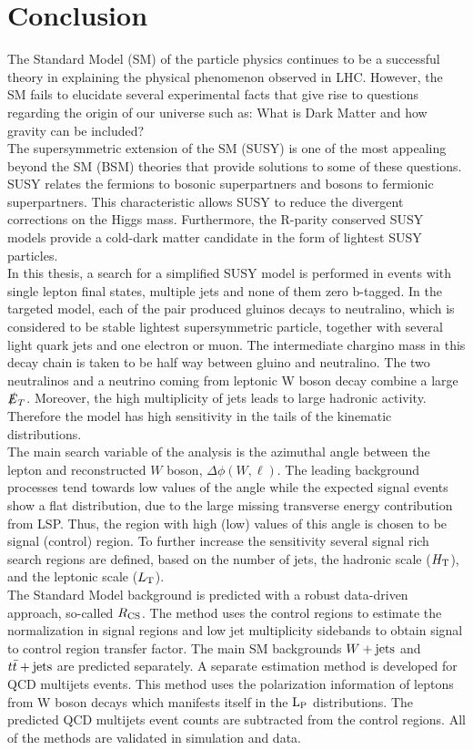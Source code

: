 \chapter{Conclusion}
The Standard Model (SM) of the particle physics continues to be a successful theory in explaining the physical phenomenon observed in LHC. However, the SM fails to elucidate several experimental facts that give rise to questions regarding the origin of our universe such as: What is Dark Matter and how gravity can be included?\\
The supersymmetric extension of the SM (SUSY) is one of the most appealing beyond the SM (BSM) theories that provide solutions to some of these questions. SUSY relates the fermions to bosonic superpartners and bosons to fermionic superpartners. This characteristic allows SUSY to reduce the divergent corrections on the Higgs mass.  Furthermore, the R-parity conserved SUSY models provide a cold-dark matter candidate in the form of lightest SUSY particles. \\
In this thesis, a search for a simplified SUSY model is performed in events with single lepton final states, multiple jets and none of them zero b-tagged. In the targeted model, each of the pair produced gluinos decays to neutralino, which is considered to be stable lightest supersymmetric particle, together with several light quark jets and one electron or muon. The intermediate chargino mass in this decay chain is taken to be half way between gluino and neutralino. The two neutralinos and a neutrino coming from leptonic W boson decay combine a large $\slashed{E}_T$. Moreover, the high multiplicity of jets leads to large hadronic activity. Therefore the model has high sensitivity in the tails of the kinematic distributions.  \\
The main search variable of the analysis is the azimuthal angle between the lepton and reconstructed $W$ boson, $\Delta\phi(W,\ell)$. The leading background processes tend towards low values of the angle while the expected signal events show a flat distribution, due to the large missing transverse energy contribution from LSP. Thus, the region with high (low) values of this angle is chosen to be signal (control) region. To further increase the sensitivity several signal rich search regions are defined, based on the number of jets, the hadronic scale ($H_{\rm T}$), and the leptonic scale ($L_{\rm T}$).\\
The Standard Model background is predicted with a robust data-driven approach, so-called $R_{\rm CS}$. The method uses the control regions to estimate the normalization in signal regions and low jet multiplicity sidebands to obtain signal to control region transfer factor. The main SM backgrounds $W+\textrm{jets}$ and $t\bar{t}+\textrm{jets}$ are predicted separately. A separate estimation method is developed for QCD multijets events.  This method uses the polarization information of leptons from W boson decays which manifests itself in the $\rm L_P$ distributions. The predicted QCD multijets event counts are subtracted from the control regions. All of the methods are validated in simulation and data. \\
